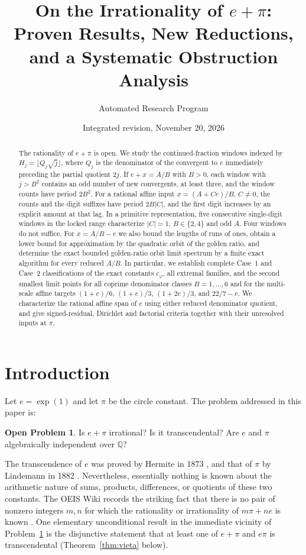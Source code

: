 \documentclass[11pt]{amsart}
\title[On the Irrationality of $e+\pi$]{On the Irrationality of $e+\pi$: Proven Results, New Reductions, and a Systematic Obstruction Analysis}
\author{Automated Research Program}
\date{Integrated revision, November 20, 2026}
\theoremstyle{definition}
\newtheorem{problem}[theorem]{Open Problem}
\theoremstyle{remark}
\numberwithin{equation}{section}
\newcommand{\Q}{\mathbb{Q}}
\newcommand{\ee}{e}
\begin{document}
\begin{abstract}
The rationality of $e+\pi$ is open. We study the continued-fraction
windows indexed by $H_j=\lfloor Q_j\sqrt j\rfloor$, where $Q_j$ is the
denominator of the convergent to $e$ immediately preceding the partial
quotient $2j$. If $e+x=A/B$ with $B>0$, each window with $j>B^2$
contains an odd number of new convergents, at least three, and the
window counts have period $2B^2$. For a rational affine input
$x=(A+Ce)/B$, $C\ne0$, the counts and the digit suffixes have period
$2B|C|$, and the first digit increases by an explicit amount at that lag.
In a primitive representation, five consecutive single-digit windows
in the locked range characterize $|C|=1$, $B\in\{2,4\}$ and odd $A$.
Four windows do not suffice. For $x=A/B-e$ we also bound the lengths
of runs of ones, obtain a lower bound for approximation by the
quadratic orbit of the golden ratio, and determine the exact
bounded golden-ratio orbit limit spectrum by a finite exact algorithm for
every reduced $A/B$. In particular, we establish complete Case~1 and Case~2
classifications of the exact constants $c_\varphi$, all extremal families,
and the second smallest limit points for all coprime denominator classes
$B=1,\dots,6$ and for the multi-scale affine targets $(1+e)/6$, $(1+e)/3$,
$(1+2e)/3$, and $22/7-e$.
We characterize the rational affine span of $e$ using
either reduced denominator quotient, and give signed-residual,
Dirichlet and factorial criteria together with their unresolved inputs
at $\pi$.
\end{abstract}

\maketitle

\section{Introduction}\label{sec:intro}

Let $\ee=\exp(1)$ and let $\pi$ be the circle constant. The problem addressed in this paper is:

\begin{problem}\label{prob:main}
Is $e+\pi$ irrational? Is it transcendental? Are $e$ and $\pi$ algebraically independent over $\Q$?
\end{problem}

The transcendence of $\ee$ was proved by Hermite in 1873 \cite{Hermite1873}, and that of $\pi$ by Lindemann in 1882 \cite{Lindemann1882}. Nevertheless, essentially nothing is known about the arithmetic nature of sums, products, differences, or quotients of these two constants. The OEIS Wiki records the striking fact that there is no pair of nonzero integers $m,n$ for which the rationality or irrationality of $m\pi+n\ee$ is known \cite{OEIS}. One elementary unconditional result in the immediate vicinity of Problem~\ref{prob:main} is the disjunctive statement that at least one of $e+\pi$ and $e\pi$ is transcendental (Theorem~\ref{thm:vieta} below).
\end{document}
